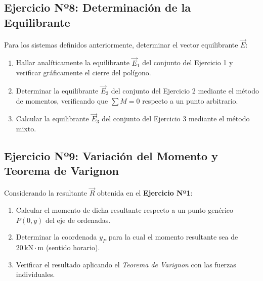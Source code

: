 \documentclass[11pt,a4paper]{article}
\begin{document}
\subsection*{Ejercicio Nº8: Determinación de la Equilibrante}
Para los sistemas definidos anteriormente, determinar el vector equilibrante $\vec{E}$:
\begin{enumerate}[label=\textbf{Sistema \arabic*:}, leftmargin=2.5cm]
    \item Hallar analíticamente la equilibrante $\vec{E}_1$ del conjunto del Ejercicio 1 y verificar gráficamente el cierre del polígono.
    \item Determinar la equilibrante $\vec{E}_2$ del conjunto del Ejercicio 2 mediante el método de momentos, verificando que $\sum M = 0$ respecto a un punto arbitrario.
    \item Calcular la equilibrante $\vec{E}_3$ del conjunto del Ejercicio 3 mediante el método mixto.
\end{enumerate}


\subsection*{Ejercicio Nº9: Variación del Momento y Teorema de Varignon}
Considerando la resultante $\vec{R}$ obtenida en el \textbf{Ejercicio Nº1}:
\begin{enumerate}[label=\alph*)]
    \item Calcular el momento de dicha resultante respecto a un punto genérico $P(0, y)$ del eje de ordenadas.
    \item Determinar la coordenada $y_P$ para la cual el momento resultante sea de $20 \, \text{kN} \cdot \text{m}$ (sentido horario).
    \item Verificar el resultado aplicando el \textit{Teorema de Varignon} con las fuerzas individuales.
\end{enumerate}
\end{document}
